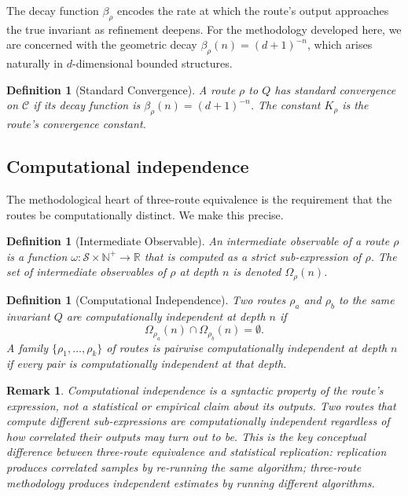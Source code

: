 \documentclass[twocolumn,11pt,a4paper]{article}
\newtheorem{definition}[theorem]{Definition}
\newtheorem{remark}[theorem]{Remark}
\newcommand{\Real}{\mathbb{R}}
\newcommand{\Natural}{\mathbb{N}}
\newcommand{\Inv}{Q}
\newcommand{\Route}{\rho}
\newcommand{\StateS}{\mathcal{S}}
\newcommand{\Depth}{n}
\newcommand{\Dim}{d}
\newcommand{\Tolb}{K}
\begin{document}
The decay function $\beta_\Route$ encodes the rate at which the route's output approaches the true invariant as refinement deepens. For the methodology developed here, we are concerned with the geometric decay $\beta_\Route(\Depth) = (\Dim+1)^{-\Depth}$, which arises naturally in $\Dim$-dimensional bounded structures.

\begin{definition}[Standard Convergence]
\label{def:standard-conv}
A route $\Route$ to $\Inv$ has \emph{standard convergence} on $\mathcal{C}$ if its decay function is $\beta_\Route(\Depth) = (\Dim+1)^{-\Depth}$. The constant $\Tolb_\Route$ is the route's \emph{convergence constant}.
\end{definition}

\subsection{Computational independence}

The methodological heart of three-route equivalence is the requirement that the routes be computationally distinct. We make this precise.

\begin{definition}[Intermediate Observable]
\label{def:intermediate}
An \emph{intermediate observable} of a route $\Route$ is a function $\omega : \StateS \times \Natural^+ \to \Real$ that is computed as a strict sub-expression of $\Route$. The set of intermediate observables of $\Route$ at depth $\Depth$ is denoted $\Omega_\Route(\Depth)$.
\end{definition}

\begin{definition}[Computational Independence]
\label{def:computational-independence}
Two routes $\Route_a$ and $\Route_b$ to the same invariant $\Inv$ are \emph{computationally independent} at depth $\Depth$ if
\[
\Omega_{\Route_a}(\Depth) \cap \Omega_{\Route_b}(\Depth) = \emptyset.
\]
A family $\{\Route_1, \ldots, \Route_k\}$ of routes is \emph{pairwise computationally independent} at depth $\Depth$ if every pair is computationally independent at that depth.
\end{definition}

\begin{remark}
Computational independence is a syntactic property of the route's expression, not a statistical or empirical claim about its outputs. Two routes that compute different sub-expressions are computationally independent regardless of how correlated their outputs may turn out to be. This is the key conceptual difference between three-route equivalence and statistical replication: replication produces correlated samples by re-running the same algorithm; three-route methodology produces independent estimates by running different algorithms.
\end{remark}
\end{document}
